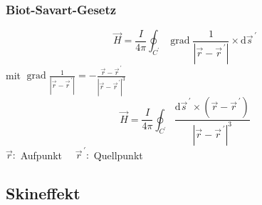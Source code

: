 \subsubsection{Biot-Savart-Gesetz}
\[ \vec{H}=\frac{I}{4 \pi} \oint_{C^{\prime}} \operatorname{grad} \frac{1}{\left|\vec{r}-\vec{r}^{\,\prime}\right|} \times \mathrm{d} \vec{s}^{\,\prime}\]
mit $\operatorname{grad} \frac{1}{\left|\vec{r}-\vec{r}^{\,\prime}\right|}=-\frac{\vec{r}-\vec{r}^{\,\prime}}{\left|\vec{r}-\vec{r}^{\,\prime}\right|^{3}}$
\[\vec{H}=\frac{I}{4 \pi} \oint_{C^{\prime}} \frac{\mathrm{d} \vec{s}^{\,\prime} \times\left(\vec{r}-\vec{r}^{\,\prime}\right)}{\left|\vec{r}-\vec{r}^{\,\prime}\right|^{3}}\]
$\vec{r}:$ Aufpunkt $\quad \vec{r}^{\,\prime}:$ Quellpunkt


\subsection{Skineffekt}


